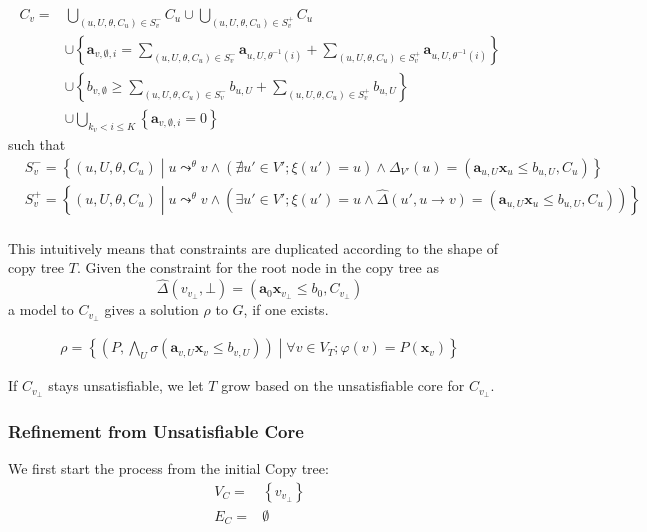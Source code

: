 \documentclass[a4paper,12pt]{article}
\newcommand{\edge}[2]{#1\rightarrow#2}
\begin{document}
\begin{align*}
C_v = & \bigcup_{(u,U,\theta,C_u) \in S_v^-} C_u \cup
\bigcup_{(u,U,\theta,C_u) \in S_v^+} C_u
\\
& \cup
\left\lbrace
 \mathbf{a}_{v,\emptyset,i} =
  \sum_{(u,U,\theta,C_u) \in S_v^-} \mathbf{a}_{u,U,\theta^{-1}(i)} +
  \sum_{(u,U,\theta,C_u) \in S_v^+} \mathbf{a}_{u,U, \theta^{-1}(i)}
\right\rbrace \\
& \cup \left\lbrace
 b_{v,\emptyset} \geq
  \sum_{(u,U,\theta,C_u) \in S_v^-} b_{u,U} +
  \sum_{(u,U,\theta,C_u) \in S_v^+} b_{u,U}
\right\rbrace \\
& \cup \bigcup_{k_v < i \leq K} \left\lbrace \mathbf{a}_{v,\emptyset,i} = 0 \right\rbrace
\end{align*}
such that
\begin{align*}
& S_v^- = \left\lbrace (u, U, \theta, C_u) \middle|
  u \mathop{\leadsto}^\theta v \wedge
  \left( \nexists u' \in V'; \xi (u') = u \right) \wedge
  \Delta_{V'} (u) = (\mathbf{a}_{u,U} \mathbf{x}_u \leq b_{u,U}, C_u) \right\rbrace
\\
& S_v^+ = \left\lbrace (u, U, \theta, C_u) \middle|
  u \mathop{\leadsto}^\theta v \wedge
  \left( \exists u' \in V'; \xi (u') = u \wedge
  \hat \Delta (u', \edge{u}{v}) = (\mathbf{a}_{u,U} \mathbf{x}_u \leq b_{u,U}, C_u) \right) \right\rbrace
\\
\end{align*}

This intuitively means that constraints are duplicated according to
the shape of copy tree $T$.  Given the constraint for the root node in
the copy tree as
\[ \hat \Delta (v_{v_\bot}, \bot) = (\mathbf{a}_0 \mathbf{x}_{v_\bot} \leq b_0, C_{v_\bot}) \]
a model to $C_{v_\bot}$ gives a solution $\rho$ to $G$, if one exists.

\begin{align*}
 \rho = \left\lbrace
  \left( P, \bigwedge_U \sigma(\mathbf{a}_{v,U} \mathbf{x}_v \leq b_{v,U}) \right) \middle|
  \forall v \in V_T; \varphi(v) = P(\mathbf{x}_v)
 \right\rbrace
\end{align*}

If $C_{v_\bot}$ stays unsatisfiable, we let $T$ grow based on the
unsatisfiable core for $C_{v_\bot}$.

\subsubsection{Refinement from Unsatisfiable Core}

We first start the process from the initial Copy tree:
\begin{align*}
V_C = & \left\lbrace v_{v_\bot} \right\rbrace \\
E_C = & \emptyset
\end{align*}
\end{document}
